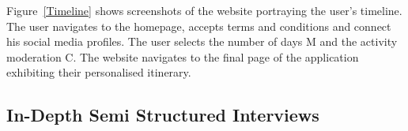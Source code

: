 Figure~\ref{Timeline} shows screenshots of the website portraying
the user's timeline.  The user navigates to the
homepage, accepts terms and conditions and connect his
social media profiles.  The user selects the number of
days M and the activity moderation C.  The website
navigates to the final page of the application
exhibiting their personalised itinerary. 

\subsection{In-Depth Semi Structured Interviews}

